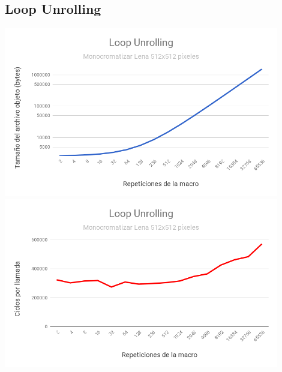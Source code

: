 \subsection{Loop Unrolling}

\begin{center}

	\includegraphics[width=0.9\textwidth]{imagenes/loopunrolling/size.png} \\
	\includegraphics[width=0.9\textwidth]{imagenes/loopunrolling/time.png}

\end{center}


